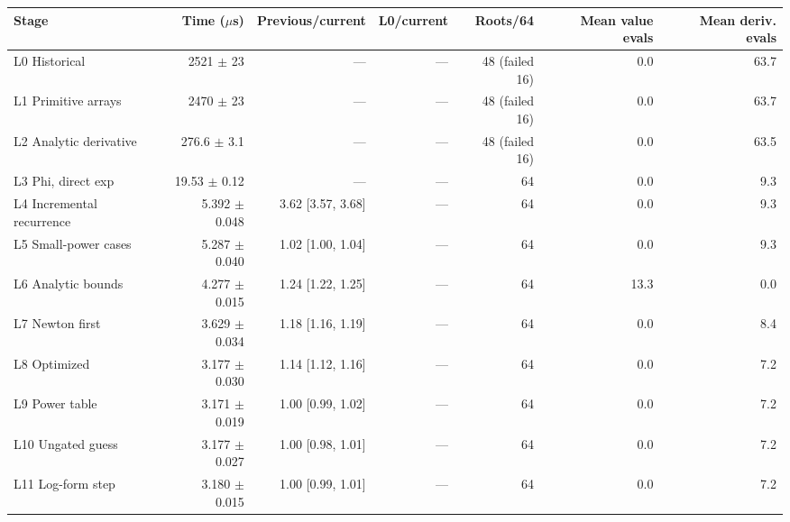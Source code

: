 \begin{tabular}{lrrrrrr}
\toprule
Stage & Time ($\mu$s) & Previous/current & L0/current & Roots/64 & Mean value evals & Mean deriv. evals \\
\midrule
L0 Historical & 2521 $\pm$ 23 & --- & --- & 48 (failed 16) & 0.0 & 63.7 \\
L1 Primitive arrays & 2470 $\pm$ 23 & --- & --- & 48 (failed 16) & 0.0 & 63.7 \\
L2 Analytic derivative & 276.6 $\pm$ 3.1 & --- & --- & 48 (failed 16) & 0.0 & 63.5 \\
L3 Phi, direct exp & 19.53 $\pm$ 0.12 & --- & --- & 64 & 0.0 & 9.3 \\
L4 Incremental recurrence & 5.392 $\pm$ 0.048 & 3.62 [3.57, 3.68] & --- & 64 & 0.0 & 9.3 \\
L5 Small-power cases & 5.287 $\pm$ 0.040 & 1.02 [1.00, 1.04] & --- & 64 & 0.0 & 9.3 \\
L6 Analytic bounds & 4.277 $\pm$ 0.015 & 1.24 [1.22, 1.25] & --- & 64 & 13.3 & 0.0 \\
L7 Newton first & 3.629 $\pm$ 0.034 & 1.18 [1.16, 1.19] & --- & 64 & 0.0 & 8.4 \\
L8 Optimized & 3.177 $\pm$ 0.030 & 1.14 [1.12, 1.16] & --- & 64 & 0.0 & 7.2 \\
L9 Power table & 3.171 $\pm$ 0.019 & 1.00 [0.99, 1.02] & --- & 64 & 0.0 & 7.2 \\
L10 Ungated guess & 3.177 $\pm$ 0.027 & 1.00 [0.98, 1.01] & --- & 64 & 0.0 & 7.2 \\
L11 Log-form step & 3.180 $\pm$ 0.015 & 1.00 [0.99, 1.01] & --- & 64 & 0.0 & 7.2 \\
\bottomrule
\end{tabular}
